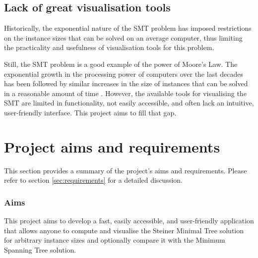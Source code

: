 \documentclass{l4proj}
\begin{document}
\subsection{Lack of great visualisation tools}
Historically, the exponential nature of the SMT problem has imposed restrictions on the instance sizes that can be solved on an average computer, thus limiting the practicality and usefulness of visualisation tools for this problem.

Still, the SMT problem is a good example of the power of Moore's Law. The exponential growth in the processing power of computers over the last decades has been followed by similar increases in the size of instances that can be solved in a reasonable amount of time \citep{29ee725d11ac4584b72f7fe66c4326fa}.
However, the available tools for visualising the SMT are limited in functionality, not easily accessible, and often lack an intuitive, user-friendly interface.
This project aims to fill that gap.





\section{Project aims and requirements}
This section provides a summary of the project's aims and requirements. Please refer to section \ref{sec:requirements} for a detailed discussion.

\subsubsection{Aims}
This project aims to develop a fast, easily accessible, and user-friendly application that allows anyone to compute and visualise the Steiner Minimal Tree solution for arbitrary instance sizes and optionally compare it with the Minimum Spanning Tree solution.
\end{document}
